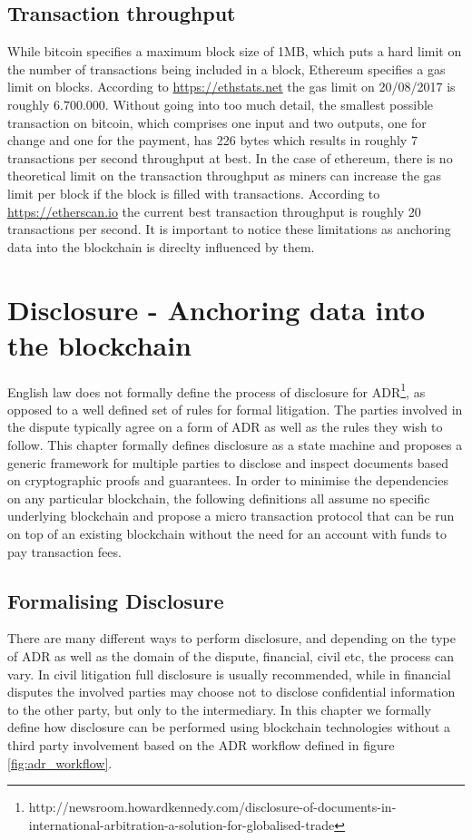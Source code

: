 \documentclass[12pt,msc,a4paper,oneside]{ucl_thesis}
\begin{document}
\section{Transaction throughput}
While bitcoin specifies a maximum block size of 1MB, which puts a hard limit on the number of transactions being included in a block, Ethereum specifies a gas limit on blocks. According to \url{https://ethstats.net} the gas limit on 20/08/2017 is roughly $6.700.000$. Without going into too much detail, the smallest possible transaction on bitcoin, which comprises one input and two outputs, one for change and one for the payment, has 226 bytes which results in roughly 7 transactions per second throughput at best. In the case of ethereum, there is no theoretical limit on the transaction throughput as miners can increase the gas limit per block if the block is filled with transactions. According to \url{https://etherscan.io} the current best transaction throughput is roughly 20 transactions per second. It is important to notice these limitations as anchoring data into the blockchain is direclty influenced by them.


\chapter{Disclosure - Anchoring data into the blockchain} \label{chapter:anchoring_data_into_the_blockchain}
English law does not formally define the process of disclosure for ADR\footnote{http://newsroom.howardkennedy.com/disclosure-of-documents-in-international-arbitration-a-solution-for-globalised-trade}, as opposed to a well defined set of rules for formal litigation. The parties involved in the dispute typically agree on a form of ADR as well as the rules they wish to follow. This chapter formally defines disclosure as a state machine and proposes a generic framework for multiple parties to disclose and inspect documents based on cryptographic proofs and guarantees. In order to minimise the dependencies on any particular blockchain, the following definitions all assume no specific underlying blockchain and propose a micro transaction protocol that can be run on top of an existing blockchain without the need for an account with funds to pay transaction fees.


\section{Formalising Disclosure} \label{sec:formalising_disclosure}
There are many different ways to perform disclosure, and depending on the type of ADR as well as the domain of the dispute, financial, civil etc, the process can vary. In civil litigation full disclosure is usually recommended, while in financial disputes the involved parties may choose not to disclose confidential information to the other party, but only to the intermediary. In this chapter we formally define how disclosure can be performed using blockchain technologies without a third party involvement based on the ADR workflow defined in figure \ref{fig:adr_workflow}.
\end{document}
